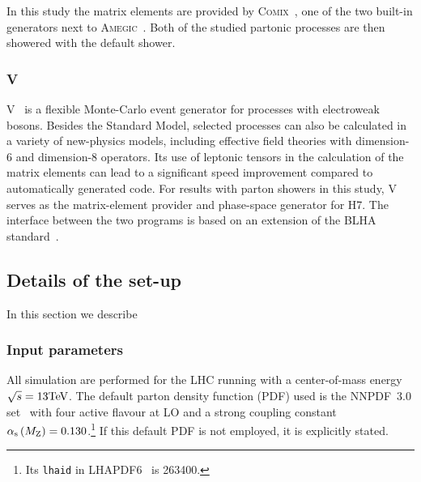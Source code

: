 \documentclass[11pt]{cernrep}
\newcommand{\Herwig}{H\protect\scalebox{0.8}{ERWIG}7\xspace}
\newcommand{\VBFNLO}{V\protect\scalebox{0.8}{BFNLO}\xspace}
\begin{document}
In this study the matrix elements are provided by \textsc{Comix}~\cite{Gleisberg:2008fv}, one of the two built-in generators next to \textsc{Amegic}~\cite{Krauss:2001iv}. Both of the studied partonic processes are then showered with the default shower.

\subsubsection*{\protect\VBFNLO \label{vbs_VBFNLO}}
\VBFNLO~\cite{Arnold:2008rz,Arnold:2011wj,Baglio:2014uba} is a flexible
Monte-Carlo event generator for processes with electroweak bosons.
Besides the Standard Model, selected processes can also be calculated in
a variety of new-physics models, including effective field theories with
dimension-6 and dimension-8 operators.
Its use of leptonic tensors in the calculation of the matrix elements
can lead to a significant speed improvement compared to automatically
generated code.
For results with parton showers in this study, \VBFNLO serves as the
matrix-element provider and phase-space generator for \Herwig. The
interface between the two programs is based on an extension of the BLHA
standard~\cite{Binoth:2010xt,Alioli:2013nda,Andersen:2014efa}.


\subsection{Details of the set-up \label{setup}}

In this section we describe

\subsubsection*{Input parameters}

All simulation are performed for the LHC running with a center-of-mass energy $\sqrt s = 13 {\rm TeV}$.
The default parton density function (PDF) used is the NNPDF~3.0 set~\cite{Ball:2014uwa} with four active flavour at LO and a strong coupling constant $\alpha_{\rm s}\left( M_{\rm Z} \right) = 0.130$.\footnote{Its {\tt lhaid} in LHAPDF6~\cite{Buckley:2014ana} is 263400.} 
If this default PDF is not employed, it is explicitly stated.
\end{document}
